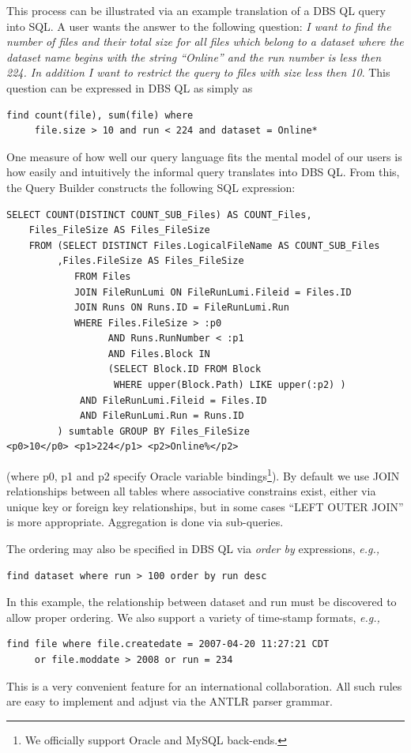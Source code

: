 \documentclass[a4paper]{jpconf}
\begin{document}
This process can be illustrated via an example translation of a
DBS QL query into SQL.  A user wants the answer to the following
question: {\it I want to find the number of files and their total
size for all files which belong to a dataset where the dataset name begins with
the string ``Online''
and the run number is less then 224. In addition I want to restrict the query
to files with size less then 10}. This question can be
expressed in DBS QL as simply as
\begin{verbatim}
find count(file), sum(file) where 
     file.size > 10 and run < 224 and dataset = Online*
\end{verbatim}
One measure of how well our query language fits the mental model of our users is
how easily and intuitively the informal query translates into DBS QL.
From this, the Query Builder constructs the following SQL expression:
\begin{verbatim}
SELECT COUNT(DISTINCT COUNT_SUB_Files) AS COUNT_Files, 
    Files_FileSize AS Files_FileSize  
    FROM (SELECT DISTINCT Files.LogicalFileName AS COUNT_SUB_Files
         ,Files.FileSize AS Files_FileSize
            FROM Files
            JOIN FileRunLumi ON FileRunLumi.Fileid = Files.ID
            JOIN Runs ON Runs.ID = FileRunLumi.Run
            WHERE Files.FileSize > :p0 
                  AND Runs.RunNumber < :p1
                  AND Files.Block IN 
                  (SELECT Block.ID FROM Block 
                   WHERE upper(Block.Path) LIKE upper(:p2) )
             AND FileRunLumi.Fileid = Files.ID
             AND FileRunLumi.Run = Runs.ID
         ) sumtable GROUP BY Files_FileSize
<p0>10</p0> <p1>224</p1> <p2>Online%</p2>
\end{verbatim}
(where p0, p1 and p2 specify Oracle variable bindings\footnote{We officially support Oracle and
MySQL back-ends.}).
By default we use JOIN relationships between all tables where associative
constrains exist, either via unique key or foreign key relationships,
but in some cases ``LEFT OUTER JOIN'' is more appropriate.
Aggregation is done via sub-queries.

The ordering may also be specified in DBS QL via {\it order by}
expressions, {\it e.g.,}
\begin{verbatim}
find dataset where run > 100 order by run desc
\end{verbatim}
In this example, the relationship between dataset and run
must be discovered to allow proper ordering.
We also support a variety of time-stamp formats, {\it e.g.,}
\begin{verbatim}
find file where file.createdate = 2007-04-20 11:27:21 CDT 
     or file.moddate > 2008 or run = 234
\end{verbatim}
This is a very convenient feature for an international collaboration.
All such rules are easy to implement and adjust via the ANTLR parser grammar.
\end{document}
